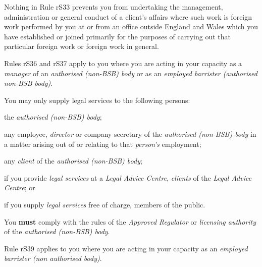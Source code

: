 Nothing in Rule rS33 prevents you from undertaking the management,
administration or general conduct of a client's affairs where such work
is foreign work performed by you at or from an office outside England
and Wales which you have established or joined primarily for the
purposes of carrying out that particular foreign work or foreign work in
general.




Rules rS36 and rS37 apply to you where you are acting in your capacity
as a \emph{manager} of an \emph{authorised (non-BSB) body} or as an
\emph{employed barrister (authorised non-BSB body)}.


You may only supply legal services to the following persons:\nl\item the \emph{authorised (non-BSB) body};
\item any employee, \emph{director} or company secretary of the
\emph{authorised (non-BSB) body} in a matter arising out of or relating
to that \emph{person's} employment;
\item any \emph{client} of the \emph{authorised (non-BSB) body};
\item if you provide \emph{legal services} at a \emph{Legal Advice Centre},
\emph{clients} of the \emph{Legal Advice Centre}; or
\item if you supply \emph{legal services} free of charge, members of the
public.\ln


You \textcolor{myred}{\textbf{must }}comply with the rules of the \emph{Approved Regulator} or
\emph{licensing authority} of the \emph{authorised (non-BSB) body}.




Rule rS39 applies to you where you are acting in your capacity as an
\emph{employed barrister (non authorised body)}.


